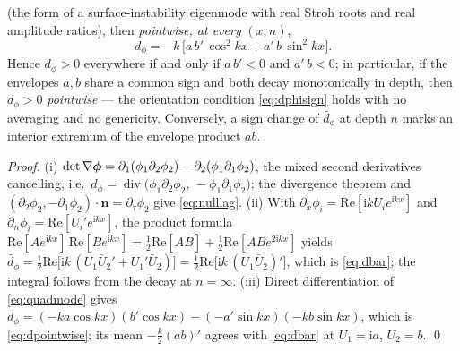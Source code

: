 \begin{lemma}
\begin{enumerate}
              (the form of a surface-instability eigenmode with real Stroh roots and real amplitude ratios), then
              \emph{pointwise, at every} $(x,n)$,
              \begin{equation}
                  \label{eq:dpointwise}
                  d_\phi=-k\,\big[a\,b'\,\cos^2 kx+a'\,b\,\sin^2 kx\big] .
              \end{equation}
              Hence $d_\phi>0$ everywhere if and only if $a\,b'<0$ and $a'\,b<0$; in particular, if the envelopes
              $a,b$ share a common sign and both decay monotonically in depth, then $d_\phi>0$ \emph{pointwise} ---
              the orientation condition \eqref{eq:dphisign} holds with no averaging and no genericity. Conversely, a
              sign change of $\bar d_\phi$ at depth $n$ marks an interior extremum of the envelope product $ab$.
    \end{enumerate}
\end{lemma}

\begin{proof}
    (i) $\det\nabla\bm\phi=\partial_1(\phi_1\partial_2\phi_2)-\partial_2(\phi_1\partial_1\phi_2)$, the mixed second
    derivatives cancelling, i.e.\ $d_\phi=\operatorname{div}\big(\phi_1\partial_2\phi_2,\,-\phi_1\partial_1\phi_2\big)$;
    the divergence theorem and $(\partial_2\phi_2,-\partial_1\phi_2)\cdot\bm{n}=\partial_\tau\phi_2$ give
    \eqref{eq:nulllag}. (ii) With $\partial_x\phi_i=\mathrm{Re}[\mathrm{i}kU_ie^{\mathrm{i}kx}]$ and
    $\partial_n\phi_i=\mathrm{Re}[U_i'e^{\mathrm{i}kx}]$, the product formula
    $\mathrm{Re}[Ae^{\mathrm{i}kx}]\,\mathrm{Re}[Be^{\mathrm{i}kx}]
        =\tfrac12\mathrm{Re}[A\bar B]+\tfrac12\mathrm{Re}[ABe^{2\mathrm{i}kx}]$ yields
    $\bar d_\phi=\tfrac12\mathrm{Re}\big[\mathrm{i}k\,(U_1\bar U_2'+U_1'\bar U_2)\big]
        =\tfrac12\mathrm{Re}\big[\mathrm{i}k\,(U_1\bar U_2)'\big]$, which is \eqref{eq:dbar}; the integral follows from
    the decay at $n=\infty$. (iii) Direct differentiation of \eqref{eq:quadmode} gives
    $d_\phi=(-ka\cos kx)(b'\cos kx)-(-a'\sin kx)(-kb\sin kx)$, which is \eqref{eq:dpointwise}; its mean
    $-\tfrac k2(ab)'$ agrees with \eqref{eq:dbar} at $U_1=\mathrm{i}a$, $U_2=b$. \qed
\end{proof}


